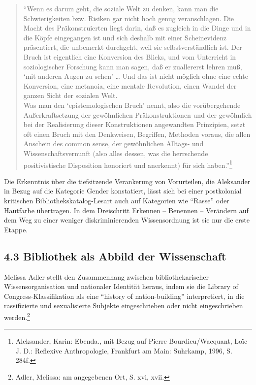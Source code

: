 \documentclass[a4paper,
fontsize=11pt,
oneside,
numbers=noperiodatend,
parskip=half-,
bibliography=totoc,
final
]{scrartcl}
\begin{document}
\begin{quote}
\enquote{Wenn es darum geht, die soziale Welt zu denken, kann man die
Schwierigkeiten bzw. Risiken gar nicht hoch genug veranschlagen. Die
Macht des Präkonstruierten liegt darin, daß es zugleich in die Dinge und
in die Köpfe eingegangen ist und sich deshalb mit einer Scheinevidenz
präsentiert, die unbemerkt durchgeht, weil sie selbstverständlich ist.
Der Bruch ist eigentlich eine Konversion des Blicks, und vom Unterricht
in soziologischer Forschung kann man sagen, daß er zuallererst lehren
muß, \enquote*{mit anderen Augen zu sehen} \ldots{} Und das ist nicht
möglich ohne eine echte Konversion, eine metanoia, eine mentale
Revolution, einen Wandel der ganzen Sicht der sozialen Welt.\\
Was man den \enquote*{epistemologischen Bruch} nennt, also die
vorübergehende Außerkraftsetzung der gewöhnlichen Präkonstruktionen und
der gewöhnlich bei der Realisierung dieser Konstruktionen angewandten
Prinzipien, setzt oft einen Bruch mit den Denkweisen, Begriffen,
Methoden voraus, die allen Anschein des common sense, der gewöhnlichen
Alltags- und Wissenschaftsvernunft (also alles dessen, was die
herrschende positivistische Disposition honoriert und anerkennt) für
sich haben.}\footnote{Aleksander, Karin: Ebenda., mit Bezug auf Pierre
  Bourdieu/Wacquant, Loïc J. D.: Reflexive Anthropologie, Frankfurt am
  Main: Suhrkamp, 1996, S. 284f.}
\end{quote}

Die Erkenntnis über die tiefsitzende Verankerung von Vorurteilen, die
Aleksander in Bezug auf die Kategorie Gender konstatiert, lässt sich bei
einer postkolonial kritischen Bibliothekskatalog-Lesart auch auf
Kategorien wie \enquote{Rasse} oder Hautfarbe übertragen. In dem
Dreischritt Erkennen -- Benennen -- Verändern auf dem Weg zu einer
weniger diskriminierenden Wissensordnung ist sie nur die erste Etappe.

\hypertarget{bibliothek-als-abbild-der-wissenschaft}{%
\subsection{4.3 Bibliothek als Abbild der
Wissenschaft}\label{bibliothek-als-abbild-der-wissenschaft}}

Melissa Adler stellt den Zusammenhang zwischen bibliothekarischer
Wissensorganisation und nationaler Identität heraus, indem sie die
Library of Congress-Klassifikation als eine \enquote{history of
nation-building} interpretiert, in die rassifizierte und sexualisierte
Subjekte eingeschrieben oder nicht eingeschrieben werden.\footnote{Adler,
  Melissa: am angegebenen Ort, S. xvi, xvii.}
\end{document}
